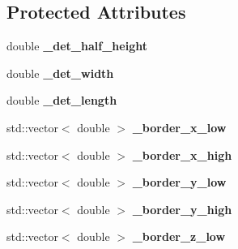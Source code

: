 \subsection*{Protected Attributes}
\begin{DoxyCompactItemize}
\item 
\hypertarget{classubana_1_1FiducialVolume_aa96f6087fbf3df5fefb0a38bf2821ca7}{double {\bfseries \-\_\-det\-\_\-half\-\_\-height}}\label{classubana_1_1FiducialVolume_aa96f6087fbf3df5fefb0a38bf2821ca7}

\item 
\hypertarget{classubana_1_1FiducialVolume_aa6d8cc1ba873cf5ada02b3072168d4c2}{double {\bfseries \-\_\-det\-\_\-width}}\label{classubana_1_1FiducialVolume_aa6d8cc1ba873cf5ada02b3072168d4c2}

\item 
\hypertarget{classubana_1_1FiducialVolume_aeab2a2472cc090816d5dcfdef27c1059}{double {\bfseries \-\_\-det\-\_\-length}}\label{classubana_1_1FiducialVolume_aeab2a2472cc090816d5dcfdef27c1059}

\item 
\hypertarget{classubana_1_1FiducialVolume_ac803313c376c431fbdf3e6be9ac88fe4}{std\-::vector$<$ double $>$ {\bfseries \-\_\-border\-\_\-x\-\_\-low}}\label{classubana_1_1FiducialVolume_ac803313c376c431fbdf3e6be9ac88fe4}

\item 
\hypertarget{classubana_1_1FiducialVolume_a2186f5bc449d255df4c57195bf9ceeb9}{std\-::vector$<$ double $>$ {\bfseries \-\_\-border\-\_\-x\-\_\-high}}\label{classubana_1_1FiducialVolume_a2186f5bc449d255df4c57195bf9ceeb9}

\item 
\hypertarget{classubana_1_1FiducialVolume_ae3bf5e12d7d6ddb724ff9399c7cc3951}{std\-::vector$<$ double $>$ {\bfseries \-\_\-border\-\_\-y\-\_\-low}}\label{classubana_1_1FiducialVolume_ae3bf5e12d7d6ddb724ff9399c7cc3951}

\item 
\hypertarget{classubana_1_1FiducialVolume_a2dd055a87dd1d87a5a85ad1b50c23b9a}{std\-::vector$<$ double $>$ {\bfseries \-\_\-border\-\_\-y\-\_\-high}}\label{classubana_1_1FiducialVolume_a2dd055a87dd1d87a5a85ad1b50c23b9a}

\item 
\hypertarget{classubana_1_1FiducialVolume_a53bbd53593df3ee49a6afc6dbe63347a}{std\-::vector$<$ double $>$ {\bfseries \-\_\-border\-\_\-z\-\_\-low}}\label{classubana_1_1FiducialVolume_a53bbd53593df3ee49a6afc6dbe63347a}


\end{DoxyCompactItemize}
